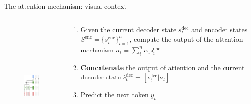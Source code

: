 \documentclass[12pt,aspectratio=169,handout]{beamer}
\begin{document}
\begin{frame}{The attention mechanism: visual context}

	\begin{columns}[T]
		\begin{column}{0.3\textwidth}
			\begin{figure}[h]
				\includegraphics[height=6.5cm]{seq2seq_attention_t1.pdf}
			\end{figure}	
		\end{column}
		\begin{column}{0.7\textwidth}
			\begin{enumerate}
			\pause
			\item Given the current decoder state $s^{\text{dec}}_t$ and encoder states $S^{\text{enc}} = \{s_i^{\text{enc}}\}_{i=1}^n$, 
				compute the output of the attention mechanism $a_t = \sum_i^n \alpha_i s_i^{\text{enc}}$
			\pause
			\item \textbf{Concatenate} the output of attention and the current decoder state $\hat{s}_t^{\text{dec}} = [s^{\text{dec}}_t | a_t]$
			\pause
			\item Predict the next token $y_t$
			\end{enumerate}
			\end{column}
	\end{columns}
	
\end{frame}
\end{document}
